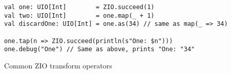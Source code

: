 \begin{algorithm}

\begin{verbatim}
val one: UIO[Int]        = ZIO.succeed(1)
val two: UIO[Int]        = one.map(_ + 1)
val discardOne: UIO[Int] = one.as(34) // same as map(_ => 34)

one.tap(n => ZIO.succeed(println(s"One: $n")))
one.debug("One") // Same as above, prints "One: "34"
\end{verbatim}

\caption{Common ZIO transform operators \label{zio:transform}}
\end{algorithm}